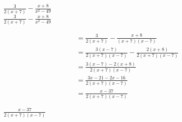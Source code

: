 \begin{enumerate} [leftmargin=0cm]
\begin{tasks}[label=(\alph*), after-item-skip=2pt,after-skip=3pt, label-width=4ex]
    \task  $ \frac{3}{2(x+7)}-\frac{x+8}{x^2-49}    $   \\   
    \task  $ \frac{3}{2(x+7)}-\frac{x+8}{x^2-49}    $   \\   
 		
            \begin{bxSolution}
             \begin{align*}
             =\frac{3}{2(x+7)}-\frac{x+8}{(x+7)(x-7)}               \\
             = \frac{3(x-7)}{2(x+7)(x-7)}-\frac{2(x+8)}{2(x+7)(x-7)}  \\     = \frac{3(x-7)-2(x+8)}{2(x+7)(x-7)}            \\ 
             = \frac{3x-21-2x-16}{2(x+7)(x-7)}   \\                             
             = \frac{x-37}{2(x+7)(x-7)}                                  \end{align*}      
             \end{bxSolution}
            \begin{envAnswer}       $  \frac{x-37}{2(x+7)(x-7)}                                         $ \end{envAnswer}


\end{tasks}


\end{enumerate}









